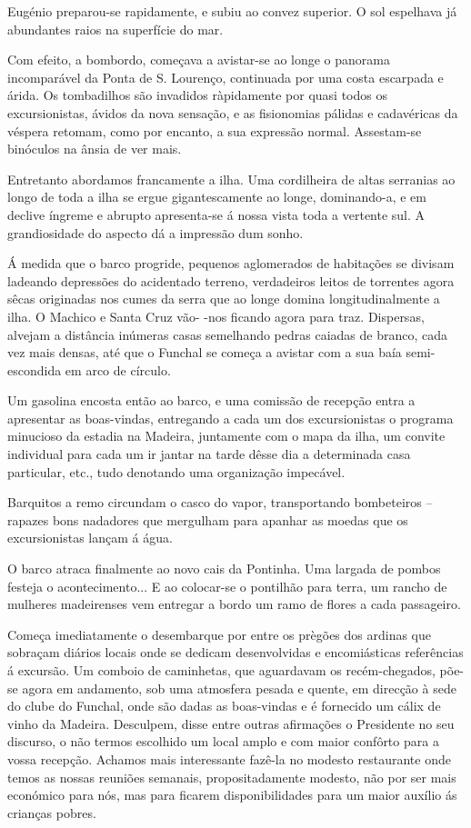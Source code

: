 \documentclass[9pt]{article}
\begin{document}
Eugé\-nio preparou-se rapidamente, e subiu ao convez superior. O sol
espe\-lhava já abundantes raios na superfície do mar.

Com efeito, a bombordo, começava a avistar-se ao longe o panorama incomparável
da Ponta de S. Lourenço, continuada por uma costa escarpada e árida. Os tombadi\-lhos são invadidos rà\-pi\-da\-men\-te por quasi todos os excursionistas, ávidos
da nova sensa\-ção, e as fisionomias pálidas e cadavéricas da véspera retomam,
como por encanto, a sua ex\-pres\-são normal. Assestam-se binóculos na ânsia de ver
mais.

Entretanto abordamos francamente a i\-lha. Uma cordi\-lheira de altas serranias ao longo de toda a i\-lha se ergue gigantescamente ao longe, dominando-a, e
em declive íngreme e abrupto apresenta-se á nossa vista toda a vertente sul.
A grandiosidade do aspecto dá a impressão dum sonho.

Á medida que o barco progride, pequenos aglomerados de habita\-ções se divisam ladeando depressões do acidentado terreno, verdadeiros leitos de torrentes agora sêcas originadas nos cumes da serra que ao longe domina longitudinalmente a i\-lha. O Machico e Santa Cruz vão- -nos fi\-cando agora para traz. Dispersas, alvejam a distância inúmeras casas seme\-lhando pedras caiadas de branco, %
cada vez mais densas, até que o Funchal se começa a avistar com a sua baía
semi-escondida em arco de círculo.

Um gasolina encosta então ao barco, e uma comissão de recep\-ção entra a
apresentar as boas-vindas, entregando a cada um dos excursionistas o programa
minucioso da estadia na Madeira, juntamente com o mapa da i\-lha, um convite individual para cada um ir jantar na tarde dêsse dia a determinada casa particular, etc., tudo denotando uma organiza\-ção impecável.

Barquitos a remo circundam o casco do vapor, transportando bombeteiros -- rapazes bons nadadores que mergu\-lham para apanhar as moedas que os excursionistas lan\-çam á água.

O barco atraca finalmente ao novo cais da Pontinha. Uma largada de pombos festeja o acontecimento... E ao colocar-se o ponti\-lhão para terra, um rancho
de mu\-lheres madeirenses vem entregar a bordo um ramo de flores a cada passageiro.

Começa imediatamente o desembarque por entre os prègões dos ardinas que sobraçam diários locais onde se dedicam desenvolvidas e encomiásticas referências
á excursão. Um comboio de caminhetas, que aguardavam os recém-chegados, põe-se
agora em andamento, sob uma atmosfera pesada e quente, em direc\-ção à sede do clube do Funchal, onde são dadas as
boas-vindas e é fornecido um cálix de vinho da Madeira. Desculpem, disse entre outras
afirma\-ções o Presidente no seu discurso, o não termos esco\-lhido um local amplo e com maior
con\-fôr\-to para a vossa recep\-ção. Achamos mais interessante fazê-la no modesto
restaurante onde temos as nossas reuniões semanais, propositadamente modesto,
não por ser mais económico para nós, mas para fi\-carem disponibilidades
para um maior auxílio ás crian\-ças pobres.
\end{document}

